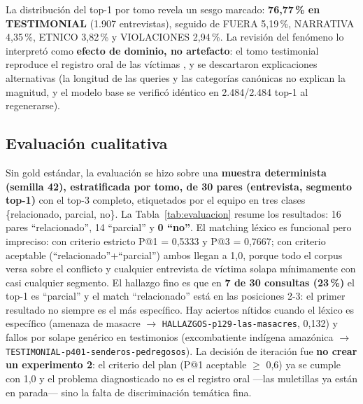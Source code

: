 \documentclass[11pt]{tg_usta}
\begin{document}
La distribución del top-1 por tomo revela un sesgo marcado: \textbf{76,77\,\% en TESTIMONIAL} (1.907 entrevistas), seguido de FUERA 5,19\,\%, NARRATIVA 4,35\,\%, ETNICO 3,82\,\% y VIOLACIONES 2,94\,\%. La revisión del fenómeno lo interpretó como \textbf{efecto de dominio, no artefacto}: el tomo testimonial reproduce el registro oral de las víctimas \cite{castillejo2023escuchar}, y se descartaron explicaciones alternativas (la longitud de las queries y las categorías canónicas no explican la magnitud, y el modelo base se verificó idéntico en 2.484/2.484 top-1 al regenerarse).

\subsection{Evaluación cualitativa}

Sin gold estándar, la evaluación se hizo sobre una \textbf{muestra determinista (semilla 42), estratificada por tomo, de 30 pares (entrevista, segmento top-1)} con el top-3 completo, etiquetados por el equipo en tres clases \{relacionado, parcial, no\}. La Tabla~\ref{tab:evaluacion} resume los resultados: 16 pares ``relacionado'', 14 ``parcial'' y \textbf{0 ``no''}. El matching léxico es funcional pero impreciso: con criterio estricto P@1 = 0,5333 y P@3 = 0,7667; con criterio aceptable (``relacionado''+``parcial'') ambos llegan a 1,0, porque todo el corpus versa sobre el conflicto y cualquier entrevista de víctima solapa mínimamente con casi cualquier segmento. El hallazgo fino es que en \textbf{7 de 30 consultas (23\,\%)} el top-1 es ``parcial'' y el match ``relacionado'' está en las posiciones 2-3: el primer resultado no siempre es el más específico. Hay aciertos nítidos cuando el léxico es específico (amenaza de masacre $\rightarrow$ \texttt{HALLAZGOS-p129-las-masacres}, 0,132) y fallos por solape genérico en testimonios (excombatiente indígena amazónica $\rightarrow$ \texttt{TESTIMONIAL-p401-senderos-pedregosos}). La decisión de iteración fue \textbf{no crear un experimento 2}: el criterio del plan (P@1 aceptable $\geq$ 0,6) ya se cumple con 1,0 y el problema diagnosticado no es el registro oral ---las muletillas ya están en parada--- sino la falta de discriminación temática fina.
\end{document}
